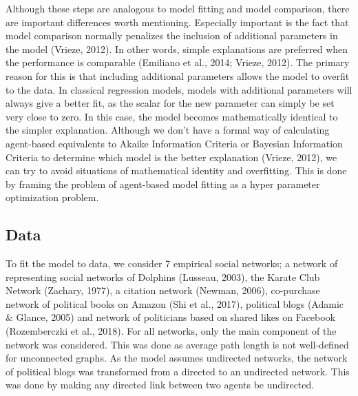 \documentclass{article}
\begin{document}
Although these steps are analogous to model fitting and model comparison, there are important differences worth mentioning. Especially important is the fact that model comparison normally penalizes the inclusion of additional parameters in the model (Vrieze, 2012). In other words, simple explanations are preferred when the performance is comparable (Emiliano et al., 2014; Vrieze, 2012). The primary reason for this is that including additional parameters allows the model to overfit to the data. In classical regression models, models with additional parameters will always give a better fit, as the scalar for the new parameter can simply be set very close to zero. In this case, the model becomes mathematically identical to the simpler explanation. Although we don’t have a formal way of calculating agent-based equivalents to Akaike Information Criteria or Bayesian Information Criteria to determine which model is the better explanation (Vrieze, 2012), we can try to avoid situations of mathematical identity and overfitting. This is done by framing the problem of agent-based model fitting as a hyper parameter optimization problem. 


\subsection{Data}
To fit the model to data, we consider 7 empirical social networks; a network of representing social networks of Dolphins (Lusseau, 2003), the Karate Club Network (Zachary, 1977), a citation network (Newman, 2006), co-purchase network of political books on Amazon (Shi et al., 2017), political blogs (Adamic \& Glance, 2005) and network of politicians based on shared likes on Facebook (Rozemberczki et al., 2018). For all networks, only the main component of the network was considered. This was done as average path length is not well-defined for unconnected graphs. As the model assumes undirected networks, the network of political blogs was transformed from a directed to an undirected network. This was done by making any directed link between two agents be undirected. 
\end{document}
